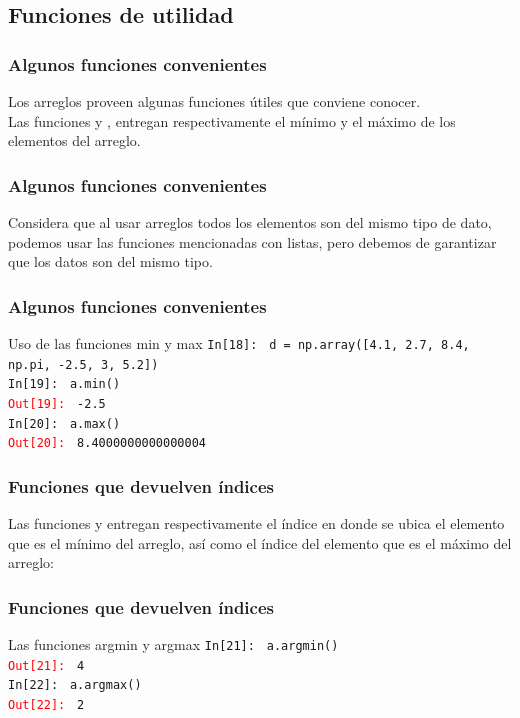 \subsection{Funciones de utilidad}
\begin{frame}[fragile]
\frametitle{Algunos funciones convenientes}
Los arreglos proveen algunas funciones útiles que conviene conocer.
\\
\bigskip
Las funciones  y , entregan respectivamente el mínimo y el máximo de los elementos del arreglo.
\end{frame}
\begin{frame}[fragile]
\frametitle{Algunos funciones convenientes}
Considera que al usar arreglos todos los elementos son del mismo tipo de dato, podemos usar las funciones mencionadas con listas, pero debemos de garantizar que los datos son del mismo tipo.
\end{frame}
\begin{frame}[fragile]
\frametitle{Algunos funciones convenientes}
\fontsize{10}{10}\selectfont
\begin{exampleblock}{Uso de las funciones min y max}
\textcolor{ao}{\texttt{In[18]: }} \texttt{d = np.array([4.1, 2.7, 8.4, np.pi, -2.5, 3, 5.2])} \\
\medskip
\pause
\textcolor{ao}{\texttt{In[19]: }} \texttt{a.min()} \\ 
\medskip
\pause
\textcolor{red}{\texttt{Out[19]: }} \texttt{-2.5} \\
\medskip
\pause
\textcolor{ao}{\texttt{In[20]: }} \texttt{a.max()} \\ 
\medskip
\pause
\textcolor{red}{\texttt{Out[20]: }} \texttt{8.4000000000000004}
\end{exampleblock}
\end{frame}
\begin{frame}[fragile]
\frametitle{Funciones que devuelven índices}
Las funciones  y  entregan respectivamente el índice en donde se ubica el elemento que es el mínimo del arreglo, así como el índice del elemento que es el máximo del arreglo:
\end{frame}
\begin{frame}[fragile]
\frametitle{Funciones que devuelven índices}
\fontsize{10}{10}\selectfont
\begin{exampleblock}{Las funciones argmin y argmax}
\textcolor{ao}{\texttt{In[21]: }} \texttt{a.argmin()} \\ 
\medskip
\pause
\textcolor{red}{\texttt{Out[21]: }} \texttt{4} \\
\medskip
\pause
\textcolor{ao}{\texttt{In[22]: }} \texttt{a.argmax()} \\ 
\medskip
\pause
\textcolor{red}{\texttt{Out[22]: }} \texttt{2}
\end{exampleblock}
\end{frame}
